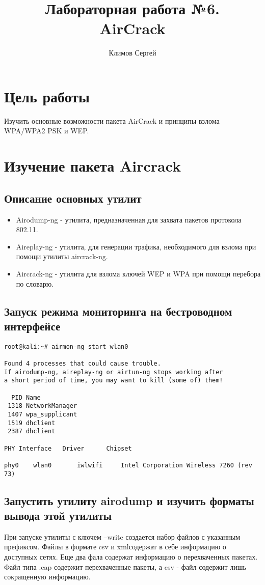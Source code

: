 \documentclass[10pt,a4paper]{report}
\author{Климов Сергей}
\title{Лабораторная работа №6.\\
	AirCrack}
\begin{document}
	\maketitle
	\renewcommand{\thesection}{\arabic{section}}
	\tableofcontents
	\pagebreak
	
	\setcounter{totalnumber}{10}
	\setcounter{topnumber}{10}
	\setcounter{bottomnumber}{10}
	\renewcommand{\topfraction}{1}
	\renewcommand{\textfraction}{0}
	
	\section{Цель работы}
		Изучить основные возможности пакета AirCrack и принципы взлома WPA/WPA2 PSK и WEP.
	\section{Изучение пакета Aircrack}
		\subsection{Описание основных утилит}
			\begin{itemize}
				\item Airodump-ng - утилита, предназначенная для захвата пакетов протокола 802.11.
				\item Aireplay-ng - утилита, для генерации трафика, необходимого для взлома при помощи утилиты aircrack-ng.
				\item Aircrack-ng - утилита для взлома ключей WEP и WPA при помощи перебора по словарю.
			\end{itemize}
		\subsection{Запуск режима мониторинга на бестроводном интерфейсе}
			\begin{lstlisting}
root@kali:~# airmon-ng start wlan0

Found 4 processes that could cause trouble.
If airodump-ng, aireplay-ng or airtun-ng stops working after
a short period of time, you may want to kill (some of) them!

  PID Name
 1318 NetworkManager
 1407 wpa_supplicant
 1519 dhclient
 2387 dhclient

PHY	Interface	Driver		Chipset

phy0	wlan0		iwlwifi		Intel Corporation Wireless 7260 (rev 73)
			\end{lstlisting}
		\subsection{Запустить утилиту airodump и изучить форматы вывода этой утилиты}
		При запуске утилиты с ключем --write создается набор файлов с указанным префиксом. Файлы в формате csv и xmlсодержат в себе информацию о доступных сетях. 
Еще два фала содержат информацию о перехваченных пакетах. Файл типа .cap содержит перехваченные пакеты, а csv - файл содержит лишь сокращенную информацию.
\end{document}

